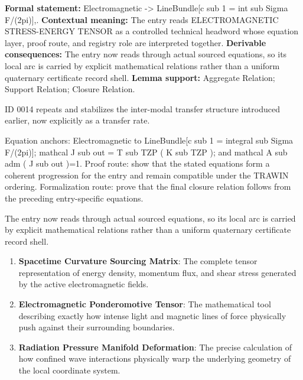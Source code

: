 \begingroup\footnotesize\setlength{\emergencystretch}{3em}\sloppy
\textbf{Formal statement:} Electromagnetic -> LineBundle[c sub 1 = int sub Sigma F/(2pi)],. \textbf{Contextual meaning:} The entry reads ELECTROMAGNETIC STRESS-ENERGY TENSOR as a controlled technical headword whose equation layer, proof route, and registry role are interpreted together. \textbf{Derivable consequences:} The entry now reads through actual sourced equations, so its local arc is carried by explicit mathematical relations rather than a uniform quaternary certificate record shell. \textbf{Lemma support:} Aggregate Relation; Support Relation; Closure Relation.\par
\endgroup

ID 0014 repeats and stabilizes the inter-modal transfer structure introduced earlier, now explicitly as a transfer rate.

Equation anchors: Electromagnetic to LineBundle[c sub 1 = integral sub Sigma F/(2pi)]; mathcal J sub out = T sub TZP ( K sub TZP ); and mathcal A sub adm ( J sub out )=1. Proof route: show that the stated equations form a coherent progression for the entry and remain compatible under the TRAWIN ordering. Formalization route: prove that the final closure relation follows from the preceding entry-specific equations.

The entry now reads through actual sourced equations, so its local arc is carried by explicit mathematical relations rather than a uniform quaternary certificate record shell.
\endgroup

\begin{enumerate}[leftmargin=1.6em,itemsep=6pt,topsep=4pt]
\item \textbf{Spacetime Curvature Sourcing Matrix}: The complete tensor representation of energy density, momentum flux, and shear stress generated by the active electromagnetic fields.
\item \textbf{Electromagnetic Ponderomotive Tensor}: The mathematical tool describing exactly how intense light and magnetic lines of force physically push against their surrounding boundaries.
\item \textbf{Radiation Pressure Manifold Deformation}: The precise calculation of how confined wave interactions physically warp the underlying geometry of the local coordinate system.
\end{enumerate}

